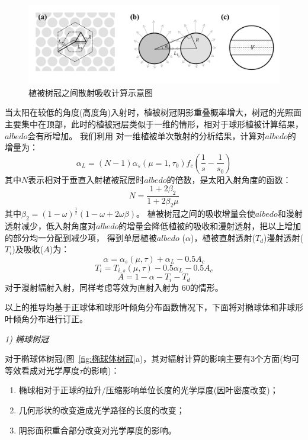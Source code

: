 {
\begin{figure}[htbp]
\centering
\includegraphics[width=0.95\columnwidth]{Figures/辐射过程及辐射通量计算/散射吸收计算示意图.png}
\caption{植被树冠之间散射吸收计算示意图}
\label{fig:散射吸收计算示意图}
\end{figure}
}

当太阳在较低的角度(高度角)入射时，植被树冠阴影重叠概率增大，树冠的光照面主要集中在顶部，此时的植被冠层类似于一维的情形，相对于球形植被计算结果，$albedo$会有所增加。
我们利用 \citet{dickinson1983land} 对一维植被单次散射的分析结果，计算对$albedo$的增量为：
\begin{equation}
\alpha_{L}=(N-1) \alpha_{s}\left(\mu=1, \tau_{0}\right) f_{c}\left(\frac{1}{s}-\frac{1}{s_{0}}\right)
\end{equation}
其中$N$表示相对于垂直入射植被冠层时$albedo$的倍数，是太阳入射角度的函数：
\begin{equation}
N=\frac{1+2 \beta_{2}}{1+2 \beta_{2} \mu}
\end{equation}
其中$\beta_2=\left(1-\omega\right)^\frac{1}{2}(1-\omega+2\omega\beta)$。
植被树冠之间的吸收增量会使$albedo$和漫射透射减少，低入射角度对$albedo$的增量会降低植被的吸收和漫射透射，把以上增加的部分均一分配到减少项，
得到单层植被$albedo$ ($\alpha$)，植被直射透射($T_d$)漫射透射($T_i$)及吸收($A$)为：
\begin{equation}
\alpha=\alpha_{s}(\mu, \tau)+\alpha_{L}-0.5 A_{c}
\end{equation}
\begin{equation}
T_{i}=T_{i, s}(\mu, \tau)-0.5 \alpha_{L}-0.5 A_{c}
\end{equation}
\begin{equation}
A=1-\alpha-T_{i}-T_{d}
\end{equation}
对于漫射辐射入射，同样考虑等效为直射入射为 60\textdegree 的情形。

以上的推导均基于正球体和球形叶倾角分布函数情况下，下面将对椭球体和非球形叶倾角分布进行订正。

\textit{1) 椭球树冠}

对于椭球体树冠(图~\ref{fig:椭球体树冠}a)，其对辐射计算的影响主要有3个方面(均可等效看成对光学厚度$\tau$的影响)：
\begin{enumerate}
    \item 椭球相对于正球的拉升/压缩影响单位长度的光学厚度(因叶密度改变)；
    \item 几何形状的改变造成光学路径的长度的改变；
    \item 阴影面积重合部分改变对光学厚度的影响。
\end{enumerate}

